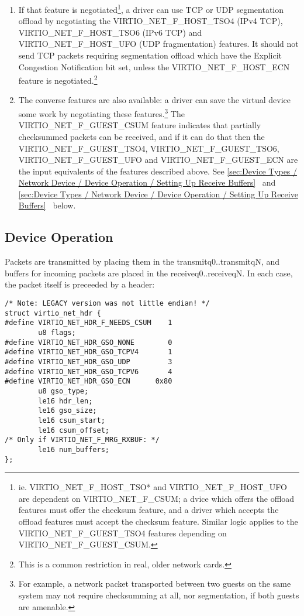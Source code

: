 \begin{enumerate}
\item If that feature is negotiated\footnote{ie. VIRTIO_NET_F_HOST_TSO* and VIRTIO_NET_F_HOST_UFO are
dependent on VIRTIO_NET_F_CSUM; a dvice which offers the offload
features must offer the checksum feature, and a driver which
accepts the offload features must accept the checksum feature.
Similar logic applies to the VIRTIO_NET_F_GUEST_TSO4 features
depending on VIRTIO_NET_F_GUEST_CSUM.
}, a driver can use TCP or UDP
  segmentation offload by negotiating the VIRTIO_NET_F_HOST_TSO4 (IPv4
  TCP), VIRTIO_NET_F_HOST_TSO6 (IPv6 TCP) and VIRTIO_NET_F_HOST_UFO
  (UDP fragmentation) features. It should not send TCP packets
  requiring segmentation offload which have the Explicit Congestion
  Notification bit set, unless the VIRTIO_NET_F_HOST_ECN feature is
  negotiated.\footnote{This is a common restriction in real, older network cards.
}

\item The converse features are also available: a driver can save
  the virtual device some work by negotiating these features.\footnote{For example, a network packet transported between two guests on
the same system may not require checksumming at all, nor segmentation,
if both guests are amenable.
}
   The VIRTIO_NET_F_GUEST_CSUM feature indicates that partially
  checksummed packets can be received, and if it can do that then
  the VIRTIO_NET_F_GUEST_TSO4, VIRTIO_NET_F_GUEST_TSO6,
  VIRTIO_NET_F_GUEST_UFO and VIRTIO_NET_F_GUEST_ECN are the input
  equivalents of the features described above.
  See \ref{sec:Device Types / Network Device / Device Operation / Setting Up Receive Buffers}~ and \ref{sec:Device Types / Network Device / Device Operation / Setting Up Receive Buffers}~ below.
\end{enumerate}

\subsection{Device Operation}\label{sec:Device Types / Network Device / Device Operation}

Packets are transmitted by placing them in the
transmitq0..transmitqN, and buffers for incoming packets are
placed in the receiveq0..receiveqN. In each case, the packet
itself is preceeded by a header:

\begin{lstlisting}
/* Note: LEGACY version was not little endian! */
struct virtio_net_hdr {
#define VIRTIO_NET_HDR_F_NEEDS_CSUM    1
        u8 flags;
#define VIRTIO_NET_HDR_GSO_NONE        0
#define VIRTIO_NET_HDR_GSO_TCPV4       1
#define VIRTIO_NET_HDR_GSO_UDP         3
#define VIRTIO_NET_HDR_GSO_TCPV6       4
#define VIRTIO_NET_HDR_GSO_ECN      0x80
        u8 gso_type;
        le16 hdr_len;
        le16 gso_size;
        le16 csum_start;
        le16 csum_offset;
/* Only if VIRTIO_NET_F_MRG_RXBUF: */
        le16 num_buffers;
};
\end{lstlisting}

